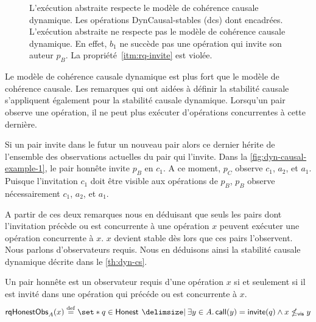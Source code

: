 \begin{figure}[htb]
\begin{subfigure}{\linewidth}
    \caption{}\label{fig:dyn-causal-example-2}
\end{subfigure}
\caption[Stabilité causale dynamique]{L'exécution abstraite  respecte le modèle de cohérence causale dynamique.
Les opérations DynCausal-stables (dcs) dont encadrées.
L'exécution abstraite  ne respecte pas le modèle de cohérence causale dynamique.
En effet, $b_1$ ne succède pas une opération qui invite son auteur $p_B$.
La propriété~\ref{itm:rq-invite} est violée.}\label{fig:dyn-causal-example}
\end{figure}

Le modèle de cohérence causale dynamique est plus fort que le modèle de cohérence causale.
Les remarques qui ont aidées à définir la stabilité causale s'appliquent également pour la stabilité causale dynamique.
Lorsqu'un pair observe une opération, il ne peut plus exécuter d'opérations concurrentes à cette dernière.

Si un pair invite dans le futur un nouveau pair alors ce dernier hérite de l'ensemble des observations actuelles du pair qui l'invite.
Dans la \autoref{fig:dyn-causal-example-1}, le pair honnête invite $p_B$ en $c_1$.
A ce moment, $p_C$ observe $c_1$, $a_2$, et $a_1$.
Puisque l'invitation $c_1$ doit être visible aux opérations de $p_B$, $p_B$ observe nécessairement $c_1$, $a_2$, et $a_1$.


A partir de ces deux remarques nous en déduisant que seuls les pairs dont l'invitation précède ou est concurrente à une opération $x$ peuvent exécuter une opération concurrente à $x$.
$x$ devient stable dès lors que ces pairs l'observent.
Nous parlons d'observateurs requis.
Nous en déduisons ainsi la stabilité causale dynamique décrite dans le \autoref{th:dyn-cs}.

\begin{definition}
Un pair honnête est un observateur requis d'une opération $x$ si et seulement si il est invité dans une opération qui précéde ou est concurrente à $x$.
\begin{equation*}
    \trm{rqHonestObs}_A(x) \defeq \set*{q \in \trm{Honest} \given \exists y \in A \qsep \trm{call}(y) = \trm{invite}(q) \land x \nviseq y}
\end{equation*}
\end{definition}



